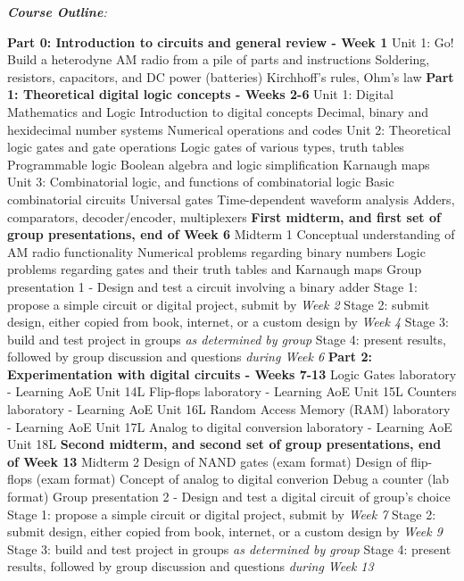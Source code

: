 \documentclass[10pt]{article}
\begin{document}
\clearpage
\textit{\textbf{Course Outline}:}
\begin{outline}[enumerate]
\1 \textbf{Part 0: Introduction to circuits and general review - Week 1}
\2 Unit 1: Go!  Build a heterodyne AM radio from a pile of parts and instructions
\3 Soldering, resistors, capacitors, and DC power (batteries)
\3 Kirchhoff's rules, Ohm's law
\1 \textbf{Part 1: Theoretical digital logic concepts - Weeks 2-6}
\2 Unit 1: Digital Mathematics and Logic
\3 Introduction to digital concepts
\3 Decimal, binary and hexidecimal number systems
\3 Numerical operations and codes
\2 Unit 2: Theoretical logic gates and gate operations
\3 Logic gates of various types, truth tables
\3 Programmable logic
\3 Boolean algebra and logic simplification
\3 Karnaugh maps
\2 Unit 3: Combinatorial logic, and functions of combinatorial logic 
\3 Basic combinatorial circuits
\3 Universal gates
\3 Time-dependent waveform analysis
\3 Adders, comparators, decoder/encoder, multiplexers
\1 \textbf{First midterm, and first set of group presentations, end of Week 6}
\2 Midterm 1
\3 Conceptual understanding of AM radio functionality
\3 Numerical problems regarding binary numbers
\3 Logic problems regarding gates and their truth tables and Karnaugh maps
\2 Group presentation 1 - Design and test a circuit involving a binary adder
\3 Stage 1: propose a simple circuit or digital project, submit by \textit{Week 2}
\3 Stage 2: submit design, either copied from book, internet, or a custom design by \textit{Week 4}
\3 Stage 3: build and test project in groups \textit{as determined by group}
\3 Stage 4: present results, followed by group discussion and questions \textit{during Week 6}
\1 \textbf{Part 2: Experimentation with digital circuits - Weeks 7-13}
\2 Logic Gates laboratory - Learning AoE Unit 14L
\2 Flip-flops laboratory - Learning AoE Unit 15L
\2 Counters laboratory - Learning AoE Unit 16L
\2 Random Access Memory (RAM) laboratory - Learning AoE Unit 17L
\2 Analog to digital conversion laboratory - Learning AoE Unit 18L
\1 \textbf{Second midterm, and second set of group presentations, end of Week 13}
\2 Midterm 2
\3 Design of NAND gates (exam format)
\3 Design of flip-flops (exam format)
\3 Concept of analog to digital converion
\3 Debug a counter (lab format)
\2 Group presentation 2 - Design and test a digital circuit of group's choice
\3 Stage 1: propose a simple circuit or digital project, submit by \textit{Week 7}
\3 Stage 2: submit design, either copied from book, internet, or a custom design by \textit{Week 9}
\3 Stage 3: build and test project in groups \textit{as determined by group}
\3 Stage 4: present results, followed by group discussion and questions \textit{during Week 13}
\end{outline}
\end{document}

